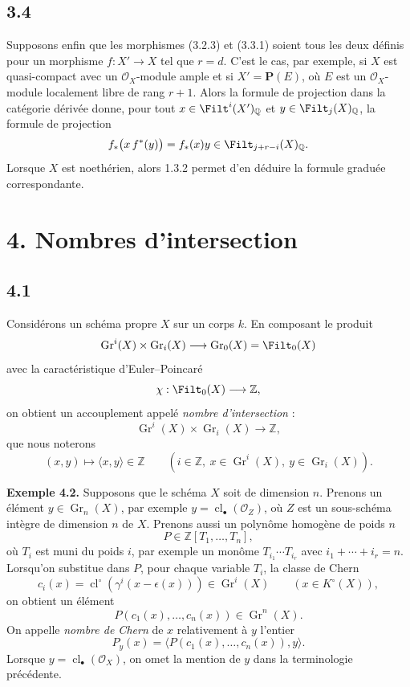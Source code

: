 \documentclass[11pt]{article}
\newcommand{\Gr}{\operatorname{Gr}}
\newcommand{\cl}{\operatorname{cl}}
\providecommand{\Gr}{\operatorname{Gr}}
\providecommand{\Gr}{\operatorname{G}}
\begin{document}
\subsection*{3.4}
Supposons enfin que les morphismes (3.2.3) et (3.3.1) soient tous les deux définis pour un morphisme \(f:X'\to X\) tel que \(r=d\). C'est le cas, par exemple, si \(X\) est quasi-compact avec un \(\mathcal O_X\)-module ample et si \(X'=\mathbf P(E)\), où \(E\) est un \(\mathcal O_X\)-module localement libre de rang \(r+1\). Alors la formule de projection dans la catégorie dérivée donne, pour tout \(x\in\Filt^i(X')_{\mathbb Q}\) et \(y\in\Filt_j(X)_{\mathbb Q}\), la formule de projection
\[
 f_*\bigl(x\,f^*(y)\bigr)=f_*(x)y\in\Filt_{j+r-i}(X)_{\mathbb Q}.
\]
Lorsque \(X\) est noethérien, alors 1.3.2 permet d'en déduire la formule graduée correspondante.

\section*{4. Nombres d'intersection}

\subsection*{4.1}
Considérons un schéma propre \(X\) sur un corps \(k\). En composant le produit
\[
 \Gr^i(X)\times\Gr_i(X)\longrightarrow \Gr_0(X)=\Filt_0(X)
\]
avec la caractéristique d'Euler--Poincaré
\[
 \chi:\Filt_0(X)\longrightarrow\mathbb Z,
\]
on obtient un accouplement appelé \emph{nombre d'intersection} :
\begin{equation}\tag{4.1.1}
 \Gr^i(X)\times\Gr_i(X)\longrightarrow \mathbb Z,
\end{equation}
que nous noterons
\[
 (x,y)\longmapsto \langle x,y\rangle\in\mathbb Z
 \qquad (i\in\mathbb Z,\ x\in\Gr^i(X),\ y\in\Gr_i(X)).
\]

\textbf{Exemple 4.2.} Supposons que le schéma \(X\) soit de dimension \(n\). Prenons un élément \(y\in\Gr_n(X)\), par exemple \(y=\cl_\bullet(\mathcal O_Z)\), où \(Z\) est un sous-schéma intègre de dimension \(n\) de \(X\). Prenons aussi un polynôme homogène de poids \(n\)
\[
 P\in\mathbb Z[T_1,\ldots,T_n],
\]
où \(T_i\) est muni du poids \(i\), par exemple un monôme \(T_{i_1}\cdots T_{i_r}\) avec \(i_1+\cdots+i_r=n\). Lorsqu'on substitue dans \(P\), pour chaque variable \(T_i\), la classe de Chern
\[
 c_i(x)=\cl^\circ(\gamma^i(x-\epsilon(x)))\in\Gr^i(X)
 \qquad(x\in K^\circ(X)),
\]
on obtient un élément
\[
 P(c_1(x),\ldots,c_n(x))\in\Gr^n(X).
\]
On appelle \emph{nombre de Chern} de \(x\) relativement à \(y\) l'entier
\[
 P_y(x)=\bigl\langle P(c_1(x),\ldots,c_n(x)),y\bigr\rangle.
\]
Lorsque \(y=\cl_\bullet(\mathcal O_X)\), on omet la mention de \(y\) dans la terminologie précédente.
\end{document}
